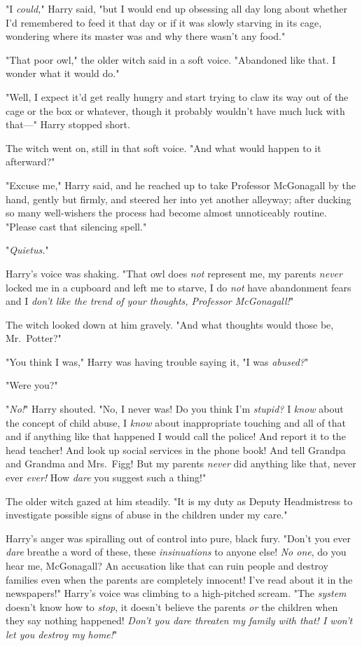 "I \emph{could,}" Harry said, "but I would end up obsessing all day long about
whether I'd remembered to feed it that day or if it was slowly starving in its
cage, wondering where its master was and why there wasn't any food."

"That poor owl," the older witch said in a soft voice. "Abandoned like that. I
wonder what it would do."

"Well, I expect it'd get really hungry and start trying to claw its way out of
the cage or the box or whatever, though it probably wouldn't have much luck
with that---" Harry stopped short.

The witch went on, still in that soft voice. "And what would happen to it
afterward?"

"Excuse me," Harry said, and he reached up to take Professor McGonagall by the
hand, gently but firmly, and steered her into yet another alleyway; after
ducking so many well-wishers the process had become almost unnoticeably
routine. "Please cast that silencing spell."

"\emph{Quietus.}"

Harry's voice was shaking. "That owl does \emph{not} represent me, my parents
\emph{never} locked me in a cupboard and left me to starve, I do \emph{not}
have abandonment fears and I \emph{don't like the trend of your thoughts,
Professor McGonagall!}"

The witch looked down at him gravely. "And what thoughts would those be,
Mr.~Potter?"

"You think I was," Harry was having trouble saying it, "I was \emph{abused?}"

"Were you?"

"\emph{No!}" Harry shouted. "No, I never was! Do you think I'm \emph{stupid?} I
\emph{know} about the concept of child abuse, I \emph{know} about inappropriate
touching and all of that and if anything like that happened I would call the
police! And report it to the head teacher! And look up social services in the
phone book! And tell Grandpa and Grandma and Mrs.~Figg! But my parents
\emph{never} did anything like that, never ever \emph{ever!} How \emph{dare}
you suggest such a thing!"

The older witch gazed at him steadily. "It is my duty as Deputy Headmistress to
investigate possible signs of abuse in the children under my care."

Harry's anger was spiralling out of control into pure, black fury. "Don't you
ever \emph{dare} breathe a word of these, these \emph{insinuations} to anyone
else! \emph{No one}, do you hear me, McGonagall? An accusation like that can
ruin people and destroy families even when the parents are completely innocent!
I've read about it in the newspapers!" Harry's voice was climbing to a
high-pitched scream. "The \emph{system} doesn't know how to \emph{stop}, it
doesn't believe the parents \emph{or} the children when they say nothing
happened! \emph{Don't you dare threaten my family with that! I won't let you
destroy my home!}"

